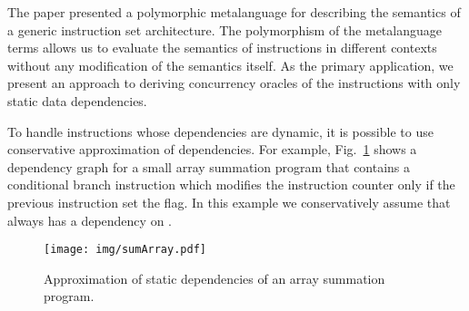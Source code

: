 The paper presented a polymorphic metalanguage for describing the semantics of
a generic instruction set architecture.
The polymorphism of the metalanguage terms allows us to evaluate the semantics
of instructions in different contexts without any modification of the semantics
itself. As the primary application, we present an approach to deriving
concurrency oracles of the instructions with only static data dependencies.

To handle instructions whose dependencies are dynamic, it is possible to use
conservative approximation of dependencies. For example, Fig.~\ref{fig-sum}
shows a dependency graph for a small array summation program that contains
a conditional branch instruction  which modifies the instruction
counter  only if the previous instruction set the  flag. In
this example we conservatively assume that  always has a dependency
on .

\begin{figure}
\centerline{\texttt{[image: img/sumArray.pdf]}}
\caption{Approximation of static dependencies of an array summation program.\label{fig-sum}}
\end{figure}

